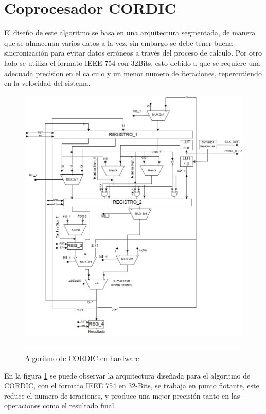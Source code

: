 \section{Coprocesador CORDIC}
El diseño de este algoritmo se basa en una arquitectura segmentada, de manera que se almacenan varios datos a la vez, sin embargo se debe tener buena sincronización para evitar datos erróneos a través del proceso de calculo. Por otro lado se utiliza el formato IEEE 754 con 32Bits, esto debido a que se requiere una adecuada precision en el calculo y un menor numero de iteraciones, repercutiendo en la velocidad del sistema. 

\begin{figure}[H]
  \centering
    \includegraphics[scale=0.6]{./CORDICLN.png}
    \rule{35em}{0.5pt}
  \caption[Algoritmo de CORDIC en hardware]{Algoritmo de CORDIC en hardware  }
  \label{fig:CORDICLN}
\end{figure}

En la figura \ref{fig:CORDICLN} se puede observar la arquitectura diseñada para el algoritmo de CORDIC, con el formato IEEE 754 en 32-Bits, se trabaja en punto flotante, este reduce el numero de ieraciones, y produce una mejor precisión tanto en las operaciones como el resultado final. 

